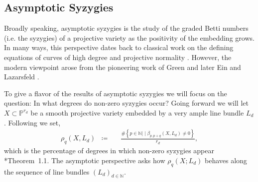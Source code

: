 \documentclass[11pt,reqno]{amsart}
\newtheorem{theorem}[lemma]{Theorem}
\theoremstyle{remark}
\newcommand{\N}{\mathbb{N}}
\renewcommand{\P}{\mathbb{P}}
\begin{document}

\subsection{Asymptotic Syzygies}

 Broadly speaking, asymptotic syzygies is the study of the graded Betti numbers (i.e. the syzygies) of a projective variety as the positivity of the embedding grows. In many ways, this perspective dates back to classical work on the defining equations of curves of high degree and projective normality \cite{mumford66, mumford70}. However, the modern viewpoint arose from the pioneering work of Green \cite{green84-I, green84-II} and later Ein and Lazarsfeld \cite{einLazarsfeld12}. 

To give a flavor of the results of asymptotic syzygies we will focus on the question: In what degrees do non-zero syzygies occur? Going forward we will let $X\subset \P^{r_{d}}$ be a smooth projective variety embedded by a very ample line bundle $L_{d}$. Following \cite{ermanYang18} we set, 
\begin{align*}
\rho_q\left(X,L_{d}\right)\;\;\coloneqq&\ \;\; \frac{\#\left\{p\in\N |\; \big| \; \beta_{p,p+q}\left(X,L_{d}\right)\neq0\right\}}{r_{d}},
\end{align*}
which is the percentage of degrees in which non-zero syzygies appear \cite{eisenbud05}*{Theorem~1.1}. The asymptotic perspective asks how $\rho_{q}(X;L_{d})$ behaves along the sequence of line bundles $(L_{d})_{d\in \N}$. 
\end{document}
